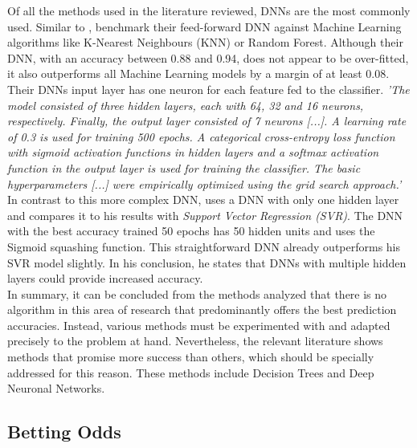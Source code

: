 Of all the methods used in the literature reviewed, DNNs are the most commonly used. Similar to \citet{deng_analysis_2020}, \citet{bhateja_analysis_2021} benchmark their feed-forward DNN against Machine Learning algorithms like K-Nearest Neighbours (KNN) or Random Forest. Although their DNN, with an accuracy between 0.88 and 0.94, does not appear to be over-fitted, it also outperforms all Machine Learning models by a margin of at least 0.08. Their DNNs input layer has one neuron for each feature fed to the classifier. \emph{'The model consisted of three hidden layers, each with 64, 32 and 16 neurons, respectively. Finally, the output layer consisted of 7 neurons [...]. A learning rate of 0.3 is used for training 500 epochs. A categorical cross-entropy loss function with sigmoid activation functions in hidden layers and a softmax activation function in the output layer is used for training the classifier. The basic hyperparameters [...] were empirically optimized using the grid search approach.'} \parencite[, p. 7]{bhateja_analysis_2021} In contrast to this more complex DNN, \citet{lutz_fantasy_2015} uses a DNN with only one hidden layer and compares it to his results with \emph{Support Vector Regression (SVR)}. The DNN with the best accuracy trained 50 epochs has 50 hidden units and uses the Sigmoid squashing function. This straightforward DNN already outperforms his SVR model slightly. In his conclusion, he states that DNNs with multiple hidden layers could provide increased accuracy. \parencite[cf.][, p. 5]{lutz_fantasy_2015} \\
\indent In summary, it can be concluded from the methods analyzed that there is no algorithm in this area of research that predominantly offers the best prediction accuracies. Instead, various methods must be experimented with and adapted precisely to the problem at hand. Nevertheless, the relevant literature shows methods that promise more success than others, which should be specially addressed for this reason. These methods include Decision Trees and Deep Neuronal Networks.

\clearpage \subsection{Betting Odds}


